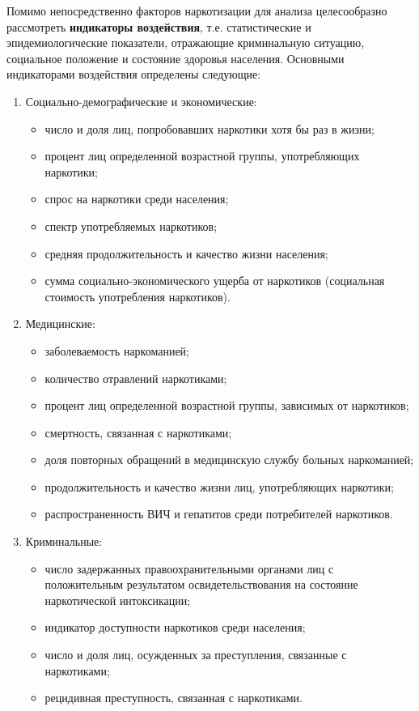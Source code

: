 Помимо непосредственно факторов наркотизации для анализа 
целесообразно рассмотреть \textbf{индикаторы воздействия}, т.е. статистические 
и эпидемиологические показатели, отражающие криминальную ситуацию, социальное 
положение и состояние здоровья населения.  Основными индикаторами воздействия 
определены следующие:
\begin{enumerate}		
    \item Социально-демографические и экономические:
    \begin{itemize}
        \item число и доля лиц, попробовавших наркотики хотя бы раз в жизни;
        \item процент лиц определенной возрастной группы, употребляющих наркотики;
        \item спрос на наркотики среди населения;
        \item спектр употребляемых наркотиков;
        \item средняя продолжительность и качество жизни населения;
        \item сумма социально-экономического ущерба от наркотиков (социальная 
            стоимость употребления наркотиков).
    \end{itemize}
    \item Медицинские:
    \begin{itemize}
        \item заболеваемость наркоманией;
        \item количество отравлений наркотиками;
        \item процент лиц определенной возрастной группы, зависимых от наркотиков;
        \item смертность, связанная с наркотиками;
        \item доля повторных обращений в медицинскую службу больных наркоманией;
        \item продолжительность и качество жизни лиц, употребляющих наркотики;
        \item распространенность ВИЧ и гепатитов среди потребителей наркотиков.
    \end{itemize}
	
    \item Криминальные:
    \begin{itemize}
        \item число задержанных правоохранительными органами лиц с положительным 
            результатом освидетельствования на состояние наркотической интоксикации;
        \item индикатор доступности наркотиков среди населения;
        \item число и доля лиц, осужденных за преступления, связанные с наркотиками;
        \item рецидивная преступность, связанная с наркотиками.
    \end{itemize}
\end{enumerate}
	
